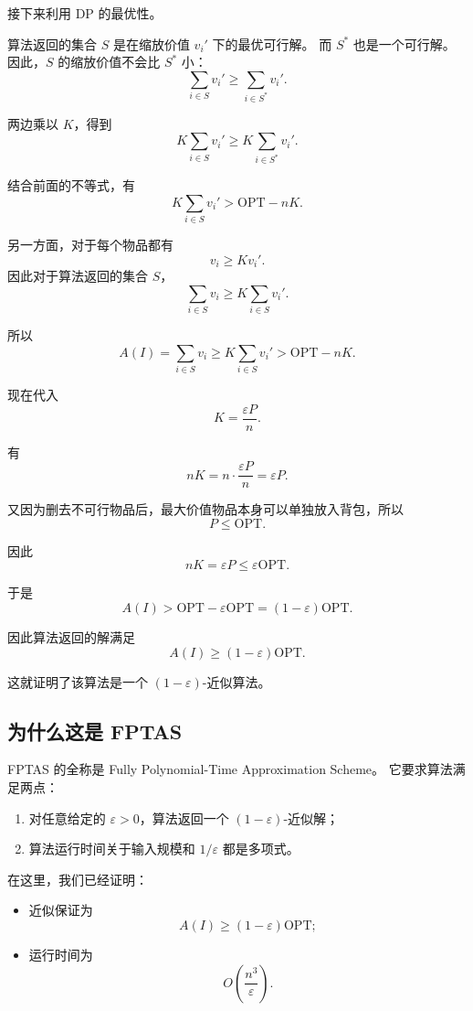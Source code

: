 \documentclass[UTF8,openany,12pt]{ctexbook}
\theoremstyle{remark}
\newcommand{\OPT}{\mathrm{OPT}}
\begin{document}
接下来利用 DP 的最优性。

算法返回的集合 $S$ 是在缩放价值 $v_i'$ 下的最优可行解。
而 $S^*$ 也是一个可行解。因此，$S$ 的缩放价值不会比 $S^*$ 小：
\[
  \sum_{i\in S}v_i'
  \ge
  \sum_{i\in S^*}v_i'.
\]

两边乘以 $K$，得到
\[
  K\sum_{i\in S}v_i'
  \ge
  K\sum_{i\in S^*}v_i'.
\]

结合前面的不等式，有
\[
  K\sum_{i\in S}v_i'
  >
  \OPT-nK.
\]

另一方面，对于每个物品都有
\[
  v_i\ge Kv_i'.
\]
因此对于算法返回的集合 $S$，
\[
  \sum_{i\in S}v_i
  \ge
  K\sum_{i\in S}v_i'.
\]

所以
\[
  A(I)
  =
  \sum_{i\in S}v_i
  \ge
  K\sum_{i\in S}v_i'
  >
  \OPT-nK.
\]

现在代入
\[
  K=\frac{\varepsilon P}{n}.
\]

有
\[
  nK
  =
  n\cdot \frac{\varepsilon P}{n}
  =
  \varepsilon P.
\]

又因为删去不可行物品后，最大价值物品本身可以单独放入背包，所以
\[
  P\le \OPT.
\]

因此
\[
  nK=\varepsilon P\le \varepsilon\OPT.
\]

于是
\[
  A(I)
  >
  \OPT-\varepsilon\OPT
  =
  (1-\varepsilon)\OPT.
\]

因此算法返回的解满足
\[
  A(I)\ge (1-\varepsilon)\OPT.
\]

这就证明了该算法是一个 $(1-\varepsilon)$-近似算法。

\subsection{为什么这是 FPTAS}

FPTAS 的全称是 Fully Polynomial-Time Approximation Scheme。
它要求算法满足两点：

\begin{enumerate}
  \item 对任意给定的 $\varepsilon>0$，算法返回一个 $(1-\varepsilon)$-近似解；
  \item 算法运行时间关于输入规模和 $1/\varepsilon$ 都是多项式。
\end{enumerate}

在这里，我们已经证明：

\begin{itemize}
  \item 近似保证为
  \[
    A(I)\ge (1-\varepsilon)\OPT;
  \]
  \item 运行时间为
  \[
    O\left(\frac{n^3}{\varepsilon}\right).
  \]
\end{itemize}
\end{document}
